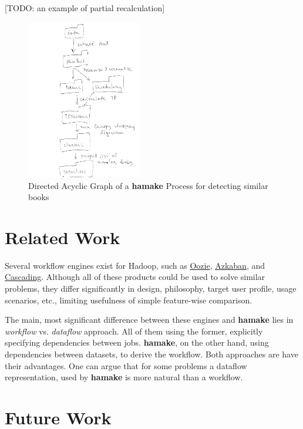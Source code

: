 \documentclass[10pt,conference,letterpaper]{IEEEtran}
\begin{document}
[TODO: an example of partial recalculation]

\begin{figure}[htp]
\centering
\includegraphics[width=0.45\textwidth]{SimilarityAlgDAG1.png}
\caption{Directed Acyclic Graph of a \textbf{hamake} Process for detecting similar books}
\label{fig:SimilarityAlgDAG}
\end{figure}

\section{Related Work}

Several workflow engines exist for Hadoop, such as
\href{http://github.com/tucu00/oozie1}{Oozie},
\href{http://sna-projects.com/azkaban/}{Azkaban}, and
\href{http://www.cascading.org/}{Cascading}.  Although all of these
products could be used to solve similar problems, they differ
significantly in design, philosophy, target user profile, usage
scenarios, etc., limiting usefulness of simple feature-wise
comparison.

The main, most significant difference between these engines and \textbf{hamake}
lies in \textit{workflow} vs. \textit{dataflow} approach. All of them
using the former, explicitly specifying dependencies between
jobs. \textbf{hamake}, on the other hand, using dependencies between datasets,
to derive the workflow. Both approaches are have their advantages. One
can argue that for some problems a dataflow representation, used by
\textbf{hamake} is more natural than a workflow.

\section{Future Work}
\end{document}
